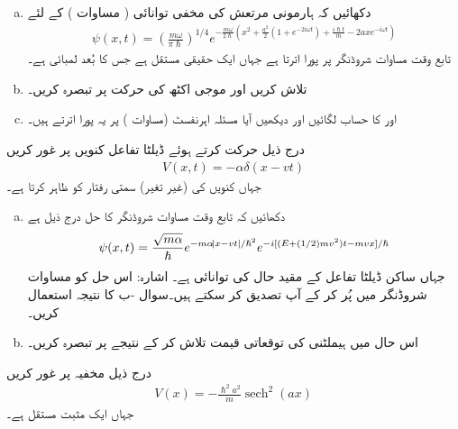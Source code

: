 \begin{enumerate}[a.]
\item
 دکھائیں کہ ہارمونی مرتعش کی مخفی توانائی ( مساوات ) کے لئے
\begin{align*}
	\psi(x, t)=\left(\frac{m\omega}{\pi\hslash}\right)^{1/4}e^{-\frac{m\omega}{2\hslash}\left(x^2+\frac{a^2}{2}(1+e^{-2i\omega t})+\frac{i\hslash t}{m}-2axe^{-i\omega t}\right)}
\end{align*}
 تابع وقت مساوات شروڈنگر پر پورا اترتا ہے جہاں  ایک حقیقی مستقل ہے جس کا بُعد لمبائی ہے۔
\item
  تلاش کریں اور موجی اکٹھ کی حرکت پر تبصرہ کریں۔
\item
  اور  کا حساب لگائیں اور دیکھیں آیا مسئلہ اہرنفسٹ (مساوات ) پر یہ پورا اترتے ہیں۔
\end{enumerate}
درج ذیل حرکت کرتے ہوئے ڈیلٹا تفاعل کنویں پر غور کریں 
\begin{align*}
	V(x, t)=-\alpha\delta(x-v t)
\end{align*}
جہاں کنویں کی (غیر تغیر) سمتی رفتار کو  ظاہر کرتا ہے۔
\begin{enumerate}[a.]
\item
 دکھائیں کہ تابع وقت مساوات شروڈنگر کا حل درج ذیل ہے
\begin{align*}
	\psi(x, t)=\frac{\sqrt{m\alpha}}{\hslash}e^{-m\alpha\abs{x-v t}/\hslash^2}e^{-i[(E+(1/2)m v^2)t-m v x]/\hslash}
\end{align*}
جہاں  ساکن ڈیلٹا تفاعل کے مقید حال کی توانائی ہے۔ اشارہ: اس حل کو مساوات شروڈنگر میں پُر کر کے آپ تصدیق کر سکتے ہیں۔سوال -ب کا نتیجہ استعمال کریں۔
\item
 اس حال میں ہیملٹنی کی توقعاتی قیمت تلاش کر کے نتیجے پر تبصرہ کریں۔
\end{enumerate}
درج ذیل مخفیہ پر غور کریں 
\begin{align*}
	V(x)=-\frac{\hslash^2a^2}{m}\operatorname{sech}^2(ax)
\end{align*}
جہاں  ایک مثبت مستقل ہے۔
